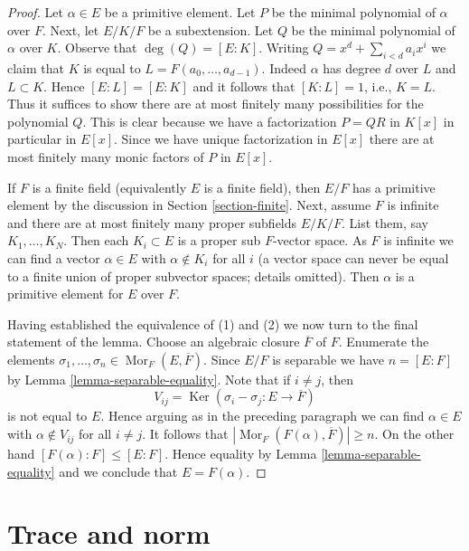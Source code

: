 \documentclass{stacks-project}
\theoremstyle{plain}
\theoremstyle{definition}
\theoremstyle{remark}
\numberwithin{equation}{subsection}
\def\Mor{\mathop{\mathrm{Mor}}\nolimits}
\def\Ker{\mathop{\mathrm{Ker}}}
\begin{document}
\begin{proof}
Let $\alpha \in E$ be a primitive element. Let $P$ be the minimal
polynomial of $\alpha$ over $F$. Next, let $E/K/F$ be a subextension.
Let $Q$ be the minimal polynomial of $\alpha$ over $K$. Observe that
$\deg(Q) = [E : K]$. Writing $Q = x^d + \sum_{i < d} a_i x^i$ we claim that
$K$ is equal to $L = F(a_0, \ldots, a_{d - 1})$. Indeed $\alpha$ has degree
$d$ over $L$ and $L \subset K$. Hence $[E : L] = [E : K]$ and it follows
that $[K : L] = 1$, i.e., $K = L$.
Thus it suffices to show there are at most finitely many possibilities
for the polynomial $Q$. This is clear because we have a factorization
$P = QR$  in $K[x]$ in particular in $E[x]$. Since we have unique
factorization in $E[x]$ there are at most finitely many monic
factors of $P$ in $E[x]$.

\medskip\noindent
If $F$ is a finite field (equivalently $E$ is a finite field), then
$E/F$ has a primitive element by the discussion in
Section \ref{section-finite}.
Next, assume $F$ is infinite and there are at most finitely many proper
subfields $E/K/F$. List them, say $K_1, \ldots, K_N$. Then
each $K_i \subset E$ is a proper sub $F$-vector space. As $F$ is infinite
we can find a vector $\alpha \in E$ with $\alpha \not \in K_i$ for all $i$
(a vector space can never be equal to a finite union of proper subvector spaces;
details omitted). Then $\alpha$ is a primitive element for $E$ over $F$.

\medskip\noindent
Having established the equivalence of (1) and (2) we now turn to
the final statement of the lemma. Choose an algebraic closure
$\overline{F}$ of $F$. Enumerate the elements
$\sigma_1, \ldots, \sigma_n \in \Mor_F(E, \overline{F})$.
Since $E/F$ is separable we have $n = [E : F]$ by
Lemma \ref{lemma-separable-equality}.
Note that if $i \not = j$, then
$$
V_{ij} = \Ker(\sigma_i - \sigma_j : E \longrightarrow \overline{F})
$$
is not equal to $E$. Hence arguing as in the preceding paragraph
we can find $\alpha \in E$ with $\alpha \not \in V_{ij}$ for all
$i \not = j$. It follows that $|\Mor_F(F(\alpha), \overline{F})| \geq n$.
On the other hand $[F(\alpha) : F] \leq [E : F]$. Hence equality
by Lemma \ref{lemma-separable-equality}
and we conclude that $E = F(\alpha)$.
\end{proof}






\section{Trace and norm}
\label{section-trace-pairing}
\end{document}
